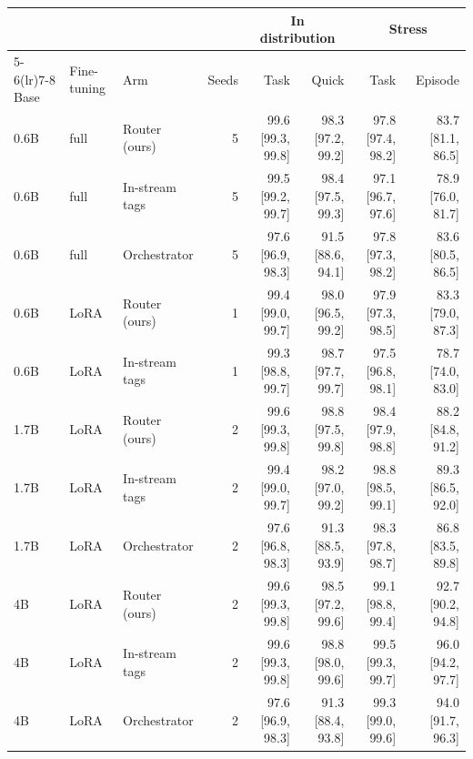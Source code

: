 \begin{tabular}{lllrrrrr}
\toprule
 & & & & \multicolumn{2}{c}{In distribution} & \multicolumn{2}{c}{Stress} \\
\cmidrule(lr){5-6}\cmidrule(lr){7-8}
Base & Fine-tuning & Arm & Seeds & Task & Quick & Task & Episode \\
\midrule
0.6B & full & Router (ours) & 5 & 99.6 {\scriptsize[99.3, 99.8]} & 98.3 {\scriptsize[97.2, 99.2]} & 97.8 {\scriptsize[97.4, 98.2]} & 83.7 {\scriptsize[81.1, 86.5]} \\
0.6B & full & In-stream tags & 5 & 99.5 {\scriptsize[99.2, 99.7]} & 98.4 {\scriptsize[97.5, 99.3]} & 97.1 {\scriptsize[96.7, 97.6]} & 78.9 {\scriptsize[76.0, 81.7]} \\
0.6B & full & Orchestrator & 5 & 97.6 {\scriptsize[96.9, 98.3]} & 91.5 {\scriptsize[88.6, 94.1]} & 97.8 {\scriptsize[97.3, 98.2]} & 83.6 {\scriptsize[80.5, 86.5]} \\
\addlinespace
0.6B & LoRA & Router (ours) & 1 & 99.4 {\scriptsize[99.0, 99.7]} & 98.0 {\scriptsize[96.5, 99.2]} & 97.9 {\scriptsize[97.3, 98.5]} & 83.3 {\scriptsize[79.0, 87.3]} \\
0.6B & LoRA & In-stream tags & 1 & 99.3 {\scriptsize[98.8, 99.7]} & 98.7 {\scriptsize[97.7, 99.7]} & 97.5 {\scriptsize[96.8, 98.1]} & 78.7 {\scriptsize[74.0, 83.0]} \\
\addlinespace
1.7B & LoRA & Router (ours) & 2 & 99.6 {\scriptsize[99.3, 99.8]} & 98.8 {\scriptsize[97.5, 99.8]} & 98.4 {\scriptsize[97.9, 98.8]} & 88.2 {\scriptsize[84.8, 91.2]} \\
1.7B & LoRA & In-stream tags & 2 & 99.4 {\scriptsize[99.0, 99.7]} & 98.2 {\scriptsize[97.0, 99.2]} & 98.8 {\scriptsize[98.5, 99.1]} & 89.3 {\scriptsize[86.5, 92.0]} \\
1.7B & LoRA & Orchestrator & 2 & 97.6 {\scriptsize[96.8, 98.3]} & 91.3 {\scriptsize[88.5, 93.9]} & 98.3 {\scriptsize[97.8, 98.7]} & 86.8 {\scriptsize[83.5, 89.8]} \\
\addlinespace
4B & LoRA & Router (ours) & 2 & 99.6 {\scriptsize[99.3, 99.8]} & 98.5 {\scriptsize[97.2, 99.6]} & 99.1 {\scriptsize[98.8, 99.4]} & 92.7 {\scriptsize[90.2, 94.8]} \\
4B & LoRA & In-stream tags & 2 & 99.6 {\scriptsize[99.3, 99.8]} & 98.8 {\scriptsize[98.0, 99.6]} & 99.5 {\scriptsize[99.3, 99.7]} & 96.0 {\scriptsize[94.2, 97.7]} \\
4B & LoRA & Orchestrator & 2 & 97.6 {\scriptsize[96.9, 98.3]} & 91.3 {\scriptsize[88.4, 93.8]} & 99.3 {\scriptsize[99.0, 99.6]} & 94.0 {\scriptsize[91.7, 96.3]} \\
\bottomrule
\end{tabular}
